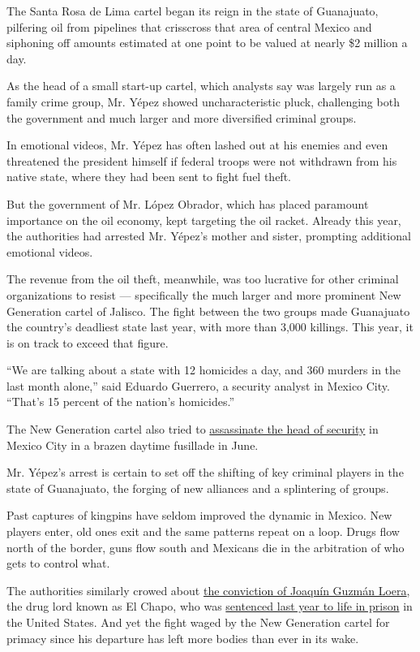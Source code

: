 The Santa Rosa de Lima cartel began its reign in the state of
Guanajuato, pilfering oil from pipelines that crisscross that area of
central Mexico and siphoning off amounts estimated at one point to be
valued at nearly \$2 million a day.

As the head of a small start-up cartel, which analysts say was largely
run as a family crime group, Mr. Yépez showed uncharacteristic pluck,
challenging both the government and much larger and more diversified
criminal groups.

In emotional videos, Mr. Yépez has often lashed out at his enemies and
even threatened the president himself if federal troops were not
withdrawn from his native state, where they had been sent to fight fuel
theft.

But the government of Mr. López Obrador, which has placed paramount
importance on the oil economy, kept targeting the oil racket. Already
this year, the authorities had arrested Mr. Yépez's mother and sister,
prompting additional emotional videos.

The revenue from the oil theft, meanwhile, was too lucrative for other
criminal organizations to resist --- specifically the much larger and
more prominent New Generation cartel of Jalisco. The fight between the
two groups made Guanajuato the country's deadliest state last year, with
more than 3,000 killings. This year, it is on track to exceed that
figure.

``We are talking about a state with 12 homicides a day, and 360 murders
in the last month alone,'' said Eduardo Guerrero, a security analyst in
Mexico City. ``That's 15 percent of the nation's homicides.''

The New Generation cartel also tried to
\href{https://www.nytimes.com/2020/06/26/world/americas/mexico-city-police-chief-shot.html}{assassinate
the head of security} in Mexico City in a brazen daytime fusillade in
June.

Mr. Yépez's arrest is certain to set off the shifting of key criminal
players in the state of Guanajuato, the forging of new alliances and a
splintering of groups.

Past captures of kingpins have seldom improved the dynamic in Mexico.
New players enter, old ones exit and the same patterns repeat on a loop.
Drugs flow north of the border, guns flow south and Mexicans die in the
arbitration of who gets to control what.

The authorities similarly crowed about
\href{https://www.nytimes.com/2019/02/12/nyregion/el-chapo-verdict.html}{the
conviction of Joaquín Guzmán Loera}, the drug lord known as El Chapo,
who was
\href{https://www.nytimes.com/2019/07/17/nyregion/el-chapo-sentencing.html}{sentenced
last year to life in prison} in the United States. And yet the fight
waged by the New Generation cartel for primacy since his departure has
left more bodies than ever in its wake.

